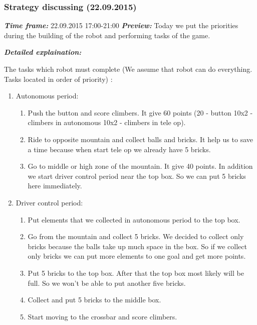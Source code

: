 \addtocounter{number_of_meeting}{1}
\subsubsection{Strategy discussing (22.09.2015)}
	\textit{\textbf{Time frame:}} 22.09.2015 17:00-21:00 \newline
	\textit{\textbf{Preview:}} Today we put the priorities during the building of the robot and performing tasks of the game.\newline \newline
  
  \newline
  \textit{\textbf{Detailed explaination:}}
  \begin{enumerate*}
  	\item The tasks which robot must complete (We assume that robot can do everything. Tasks located in order of priority) :
  	\begin{enumerate}
  		\item Autonomous period:
  		\begin{enumerate}
  			\item Push the button and score climbers. It give 60 points (20 - button 10x2 - climbers in autonomous 10x2 - climbers in tele op).
  			\item Ride to opposite mountain and collect balls and bricks. It help us to save a time because when start tele op we already have 5 bricks. 
  			\item Go to middle or high zone of the mountain. It give 40 points. In addition we start driver control period near the top box. So we can put 5 bricks here immediately.
  		\end{enumerate}
  		\item Driver control period:
  		\begin{enumerate}
	  		\item Put elements that we collected in autonomous period to the top box.
	  		\item Go from the mountain and collect 5 bricks. We decided to collect only bricks because the balls take up much space in the box. So if we collect only bricks we can put more elements to one goal and get more points.
	  		\item Put 5 bricks to the top box. After that the top box most likely will be full. So we won't be able to put another five bricks.
	  		\item Collect and put 5 bricks to the middle box.
	  		\item Start moving to the crossbar and score climbers.

\end{enumerate}
\end{enumerate}
\end{enumerate*}
